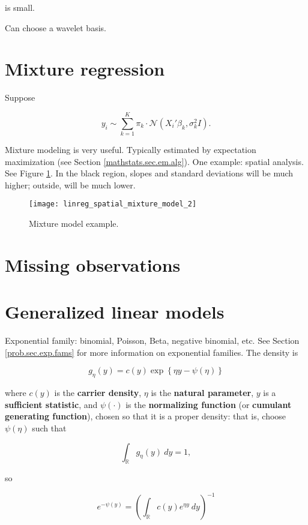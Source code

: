 is small.

Can choose a wavelet basis. 

\section{Mixture regression}

Suppose

\[
y_i \sim \sum_{k=1}^K \pi_k \cdot \mathcal{N} \left( X _i' \beta_k, \sigma_k^2 I \right).
\]

Mixture modeling is very useful. Typically estimated by expectation maximization (see Section \ref{mathstats.sec.em.alg}). One example: spatial analysis. See Figure \ref{linreg.fig.mix.model.ex}. In the black region, slopes and standard deviations will be much higher; outside, will be much lower.

\begin{figure}[htbp]
\begin{center}
\texttt{[image: linreg\_spatial\_mixture\_model\_2]}
\caption{Mixture model example.}
\label{linreg.fig.mix.model.ex}
\end{center}
\end{figure}


\section{Missing observations}

\section{Generalized linear models}\label{linreg.glm}

Exponential family: binomial, Poisson, Beta, negative binomial, etc. See Section \ref{prob.sec.exp.fams} for more information on exponential families. The density is 

\[
g_\eta(y) =  c(y) \exp \left\{  \eta y - \psi(\eta) \right\}
\]


where \(c(y)\) is the \textbf{carrier density}, \(\eta\) is the \textbf{natural parameter}, \(y\) is a \textbf{sufficient statistic}, and \(\psi(\cdot)\) is the \textbf{normalizing function} (or \textbf{cumulant generating function}), chosen so that it is a proper density: that is, choose \(\psi(\eta)\) such that

\[
\int_{\mathbb{R}} g_\eta(y) \ dy = 1,
\]

so

\[
e^{- \psi(y)} = \left( \int_{\mathbb{R}} c(y) e^{\eta y} \ dy \right)^{-1} 
\]

